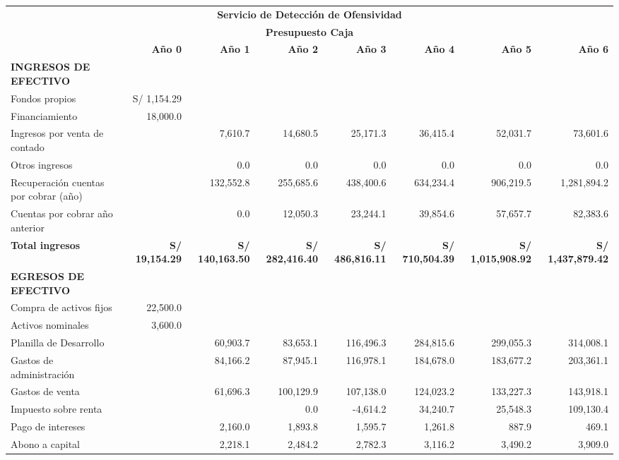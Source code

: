 \begin{table}[H]
\centering
\tiny
\renewcommand{\arraystretch}{1.15}
\setlength{\tabcolsep}{2pt}
\begin{tabular}{|p{2.9cm}|r|r|r|r|r|r|r|}
\hline
\multicolumn{8}{|c|}{\textbf{Servicio de Detección de Ofensividad}} \\
\multicolumn{8}{|c|}{\textbf{Presupuesto Caja}} \\ \hline
 & \textbf{Año 0} & \textbf{Año 1} & \textbf{Año 2} & \textbf{Año 3} & \textbf{Año 4} & \textbf{Año 5} & \textbf{Año 6} \\ \hline

\textbf{INGRESOS DE EFECTIVO} &  &  &  &  &  &  &  \\ \hline
Fondos propios & S/ 1,154.29 &  &  &  &  &  &  \\ \hline
Financiamiento & 18,000.0 &  &  &  &  &  &  \\ \hline
Ingresos por venta de contado &  & 7,610.7 & 14,680.5 & 25,171.3 & 36,415.4 & 52,031.7 & 73,601.6 \\ \hline
Otros ingresos &  & 0.0 & 0.0 & 0.0 & 0.0 & 0.0 & 0.0 \\ \hline
Recuperación cuentas por cobrar (año) &  & 132,552.8 & 255,685.6 & 438,400.6 & 634,234.4 & 906,219.5 & 1,281,894.2 \\ \hline
Cuentas por cobrar año anterior &  & 0.0 & 12,050.3 & 23,244.1 & 39,854.6 & 57,657.7 & 82,383.6 \\ \hline
\textbf{Total ingresos} & \textbf{S/ 19,154.29} & \textbf{S/ 140,163.50} & \textbf{S/ 282,416.40} & \textbf{S/ 486,816.11} & \textbf{S/ 710,504.39} & \textbf{S/ 1,015,908.92} & \textbf{S/ 1,437,879.42} \\ \hline

\textbf{EGRESOS DE EFECTIVO} &  &  &  &  &  &  &  \\ \hline
Compra de activos fijos & 22,500.0 &  &  &  &  &  &  \\ \hline
Activos nominales & 3,600.0 &  &  &  &  &  &  \\ \hline
Planilla de Desarrollo &  & 60,903.7 & 83,653.1 & 116,496.3 & 284,815.6 & 299,055.3 & 314,008.1 \\ \hline
Gastos de administración &  & 84,166.2 & 87,945.1 & 116,978.1 & 184,678.0 & 183,677.2 & 203,361.1 \\ \hline
Gastos de venta &  & 61,696.3 & 100,129.9 & 107,138.0 & 124,023.2 & 133,227.3 & 143,918.1 \\ \hline
Impuesto sobre renta &  &  & 0.0 & -4,614.2 & 34,240.7 & 25,548.3 & 109,130.4 \\ \hline
Pago de intereses &  & 2,160.0 & 1,893.8 & 1,595.7 & 1,261.8 & 887.9 & 469.1 \\ \hline
Abono a capital &  & 2,218.1 & 2,484.2 & 2,782.3 & 3,116.2 & 3,490.2 & 3,909.0 \\ \hline


\end{tabular}
\end{table}
